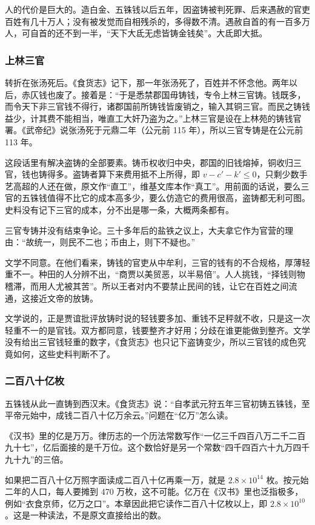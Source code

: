 人的代价是巨大的。造白金、五铢钱以后五年，因盗铸被判死罪、后来遇赦的官吏百姓有几十万人；没有被发觉而自相残杀的，多得数不清。遇赦自首的有一百多万人，可自首的还不到一半，“天下大氐无虑皆铸金钱矣”\cite{hanshu}。大氐即大抵。

\subsubsection{上林三官}
转折在张汤死后。《食货志》记下，那一年张汤死了，百姓并不怀念他。两年以后，赤仄钱也废了。接着是：“于是悉禁郡国毋铸钱，专令上林三官铸。钱既多，而令天下非三官钱不得行，诸郡国前所铸钱皆废销之，输入其铜三官。而民之铸钱益少，计其费不能相当，唯直工大奸乃盗为之。”\cite{hanshu}上林三官是设在上林苑的铸钱官署。《武帝纪》说张汤死于元鼎二年（公元前 115 年）\cite{hanshu}，所以三官专铸是在公元前 113 年。

这段话里有解决盗铸的全部要素。铸币权收归中央，郡国的旧钱熔掉，铜收归三官，钱也铸得多。盗铸者算下来费用抵不上所得，即 $v-c'-k'\le0$，只剩少数手艺高超的人还在做，原文作“直工”，维基文库本作“真工”。用前面的话说，要么三官的五铢钱值得不比它的成本高多少，要么仿造它的费用很高，盗铸都无利可图。史料没有记下三官的成本，分不出是哪一条，大概两条都有。

三官专铸并没有结束争论。三十多年后的盐铁之议上，大夫拿它作为官营的理由：“故统一，则民不二也；币由上，则下不疑也。”

文学不同意。在他们看来，铸钱的官吏从中牟利，三官的钱有的不合规格，厚薄轻重不一。种田的人分辨不出，“商贾以美贸恶，以半易倍”。人人挑钱，“择钱则物稽滞，而用人尤被其苦”。所以王者对内不要禁止民间的钱，让它在百姓之间流通\cite{yantielun}，这接近文帝的放铸。

文学说的，正是贾谊批评放铸时说的轻钱要多加、重钱不足秤就不收，只是这一次轻重不一的是官钱。双方都同意，钱要整齐才好用；分歧在谁更能做到整齐。文学没有给出三官钱轻重的数字，《食货志》也只记下盗铸变少，所以三官钱的成色究竟如何，这些史料判断不了。

\subsubsection{二百八十亿枚}
五铢钱从此一直铸到西汉末。《食货志》说：“自孝武元狩五年三官初铸五铢钱，至平帝元始中，成钱二百八十亿万余云。”\cite{hanshu}问题在“亿万”怎么读。

《汉书》里的亿是万万。律历志的一个历法常数写作“一亿三千四百八万二千二百九十七”，亿后面接的是千万位。这个数恰好是另一个常数“四千四百六十九万四千九十九”的三倍\cite{hanshu}。

如果把二百八十亿万照字面读成二百八十亿再乘一万，就是 $2.8\times10^{14}$ 枚。按元始二年的人口，每人要摊到 470 万枚，这不可能。亿万在《汉书》里也泛指极多，例如“衣食京师，亿万之口”\cite{hanshu}。本章因此把它读作二百八十亿枚以上，即 $2.8\times10^{10}$。这是一种读法，不是原文直接给出的数。

